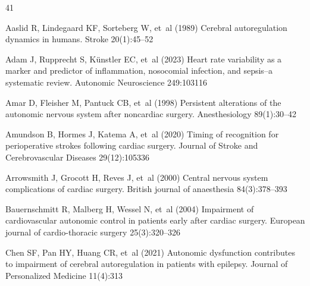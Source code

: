 \documentclass[pdflatex,sn-basic,Numbered]{sn-jnl}
\theoremstyle{thmstyleone}%
\theoremstyle{thmstyletwo}%
\theoremstyle{thmstylethree}%
\begin{document}
\begin{thebibliography}{41}
  \providecommand{\natexlab}[1]{#1}
  \providecommand{\url}[1]{{#1}}
  \providecommand{\urlprefix}{URL }
  \providecommand{\doi}[1]{\url{https://doi.org/#1}}
  \providecommand{\eprint}[2][]{\url{#2}}
  \bibcommenthead

  Aaslid R, Lindegaard KF, Sorteberg W, et~al (1989) Cerebral autoregulation
  dynamics in humans. Stroke 20(1):45--52

  Adam J, Rupprecht S, K{\"u}nstler EC, et~al (2023) Heart rate variability as a
  marker and predictor of inflammation, nosocomial infection, and sepsis--a
  systematic review. Autonomic Neuroscience 249:103116

  Amar D, Fleisher M, Pantuck CB, et~al (1998) Persistent alterations of the
  autonomic nervous system after noncardiac surgery. Anesthesiology
  89(1):30--42

  Amundson B, Hormes J, Katema A, et~al (2020) Timing of recognition for
  perioperative strokes following cardiac surgery. Journal of Stroke and
  Cerebrovascular Diseases 29(12):105336

  Arrowsmith J, Grocott H, Reves J, et~al (2000) Central nervous system
  complications of cardiac surgery. British journal of anaesthesia
  84(3):378--393

  Bauernschmitt R, Malberg H, Wessel N, et~al (2004) Impairment of cardiovascular
  autonomic control in patients early after cardiac surgery. European journal
  of cardio-thoracic surgery 25(3):320--326

  Chen SF, Pan HY, Huang CR, et~al (2021) Autonomic dysfunction contributes to
  impairment of cerebral autoregulation in patients with epilepsy. Journal of
  Personalized Medicine 11(4):313


\end{thebibliography}
\end{document}
